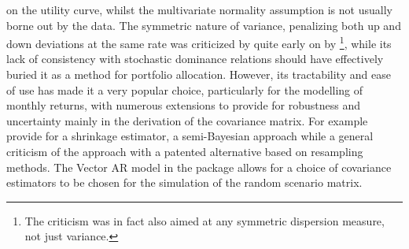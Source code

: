 on the utility curve, whilst the multivariate normality assumption is not
usually borne out by the data. The symmetric nature of variance, penalizing
both up and down deviations at the same rate was criticized by quite early on
by \footnote{The criticism was in fact also aimed at
any symmetric dispersion measure, not just variance.}, while its lack of
consistency with stochastic dominance relations should have effectively
buried it as a method for portfolio allocation. However, its tractability and
ease of use has made it a very popular choice, particularly for the modelling
of monthly returns, with numerous extensions to provide for robustness and
uncertainty mainly in the derivation of the covariance matrix. For example
 provide for a shrinkage estimator,  a
semi-Bayesian approach while  a general criticism of the
approach with a patented alternative based on resampling methods. The Vector AR
model in the package allows for a choice of covariance estimators to be chosen
for the simulation of the random scenario matrix.

